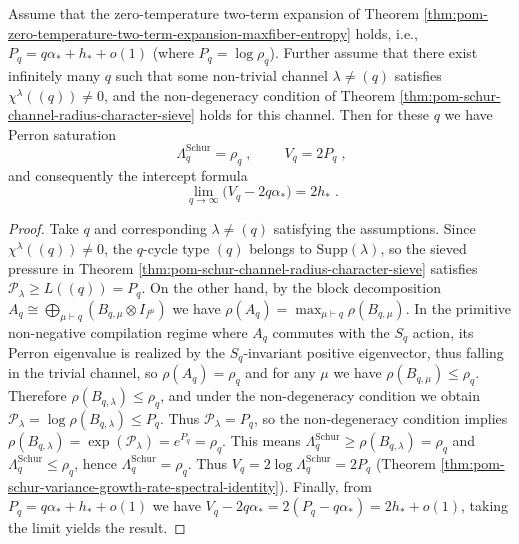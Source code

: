 \begin{proposition}\label{prop:pom-variance-intercept-equals-groundstate-entropy}
Assume that the zero-temperature two-term expansion of Theorem \ref{thm:pom-zero-temperature-two-term-expansion-maxfiber-entropy} holds, i.e.,
\(
P_q=q\alpha_\ast+h_\ast+o(1)
\)
(where \(P_q=\log\rho_q\)).
Further assume that there exist infinitely many \(q\) such that some non-trivial channel \(\lambda\neq(q)\) satisfies \(\chi^\lambda((q))\neq 0\), and the non-degeneracy condition of Theorem \ref{thm:pom-schur-channel-radius-character-sieve} holds for this channel.
Then for these \(q\) we have Perron saturation
\[
\boxed{\;\Lambda_q^{\mathrm{Schur}}=\rho_q\;},
\qquad
\boxed{\;V_q=2P_q\;},
\]
and consequently the intercept formula
\[
\boxed{\;
\lim_{q\to\infty}\bigl(V_q-2q\alpha_\ast\bigr)=2h_\ast\; } .
\]
\end{proposition}
\begin{proof}
Take \(q\) and corresponding \(\lambda\neq(q)\) satisfying the assumptions.
Since \(\chi^\lambda((q))\neq 0\), the \(q\)-cycle type \((q)\) belongs to \(\mathrm{Supp}(\lambda)\), so the sieved pressure in Theorem \ref{thm:pom-schur-channel-radius-character-sieve} satisfies
\(
\mathcal P_\lambda\ge L((q))=P_q
\).
On the other hand, by the block decomposition
\(
A_q\cong\bigoplus_{\mu\vdash q}(B_{q,\mu}\otimes I_{f^\mu})
\)
we have \(\rho(A_q)=\max_{\mu\vdash q}\rho(B_{q,\mu})\).
In the primitive non-negative compilation regime where \(A_q\) commutes with the \(S_q\) action, its Perron eigenvalue is realized by the \(S_q\)-invariant positive eigenvector, thus falling in the trivial channel, so \(\rho(A_q)=\rho_q\) and for any \(\mu\) we have \(\rho(B_{q,\mu})\le \rho_q\).
Therefore \(\rho(B_{q,\lambda})\le \rho_q\), and under the non-degeneracy condition we obtain
\(\mathcal P_\lambda=\log\rho(B_{q,\lambda})\le P_q\).
Thus \(\mathcal P_\lambda=P_q\), so the non-degeneracy condition implies
\(
\rho(B_{q,\lambda})=\exp(\mathcal P_\lambda)=e^{P_q}=\rho_q
\).
This means \(\Lambda_q^{\mathrm{Schur}}\ge \rho(B_{q,\lambda})=\rho_q\) and \(\Lambda_q^{\mathrm{Schur}}\le \rho_q\), hence \(\Lambda_q^{\mathrm{Schur}}=\rho_q\).
Thus \(V_q=2\log\Lambda_q^{\mathrm{Schur}}=2P_q\) (Theorem \ref{thm:pom-schur-variance-growth-rate-spectral-identity}).
Finally, from \(P_q=q\alpha_\ast+h_\ast+o(1)\) we have
\(
V_q-2q\alpha_\ast=2(P_q-q\alpha_\ast)=2h_\ast+o(1)
\),
taking the limit yields the result.
\end{proof}


